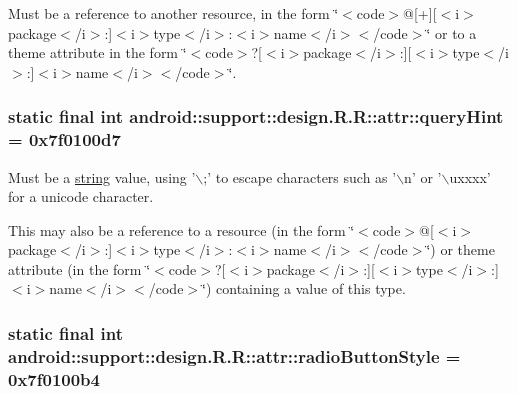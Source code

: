 Must be a reference to another resource, in the form \char`\"{}$<$code$>$@\mbox{[}+\mbox{]}\mbox{[}$<$i$>$package$<$/i$>$:\mbox{]}$<$i$>$type$<$/i$>$:$<$i$>$name$<$/i$>$$<$/code$>$\char`\"{} or to a theme attribute in the form \char`\"{}$<$code$>$?\mbox{[}$<$i$>$package$<$/i$>$:\mbox{]}\mbox{[}$<$i$>$type$<$/i$>$:\mbox{]}$<$i$>$name$<$/i$>$$<$/code$>$\char`\"{}. \hypertarget{classandroid_1_1support_1_1design_1_1_r_1_1attr_4b4ee04be647fe468cdf1075f4571a0e}{
\subsubsection[{queryHint}]{\setlength{\rightskip}{0pt plus 5cm}static final int android::support::design.R.R::attr::queryHint = 0x7f0100d7}}
\label{classandroid_1_1support_1_1design_1_1_r_1_1attr_4b4ee04be647fe468cdf1075f4571a0e}


Must be a \hyperlink{classandroid_1_1support_1_1design_1_1_r_1_1string}{string} value, using '$\backslash$;' to escape characters such as '$\backslash$n' or '$\backslash$uxxxx' for a unicode character. 

This may also be a reference to a resource (in the form \char`\"{}$<$code$>$@\mbox{[}$<$i$>$package$<$/i$>$:\mbox{]}$<$i$>$type$<$/i$>$:$<$i$>$name$<$/i$>$$<$/code$>$\char`\"{}) or theme attribute (in the form \char`\"{}$<$code$>$?\mbox{[}$<$i$>$package$<$/i$>$:\mbox{]}\mbox{[}$<$i$>$type$<$/i$>$:\mbox{]}$<$i$>$name$<$/i$>$$<$/code$>$\char`\"{}) containing a value of this type. \hypertarget{classandroid_1_1support_1_1design_1_1_r_1_1attr_eae3a00d1966ca04e5671e7a7e3293d5}{
\subsubsection[{radioButtonStyle}]{\setlength{\rightskip}{0pt plus 5cm}static final int android::support::design.R.R::attr::radioButtonStyle = 0x7f0100b4}}
\label{classandroid_1_1support_1_1design_1_1_r_1_1attr_eae3a00d1966ca04e5671e7a7e3293d5}


